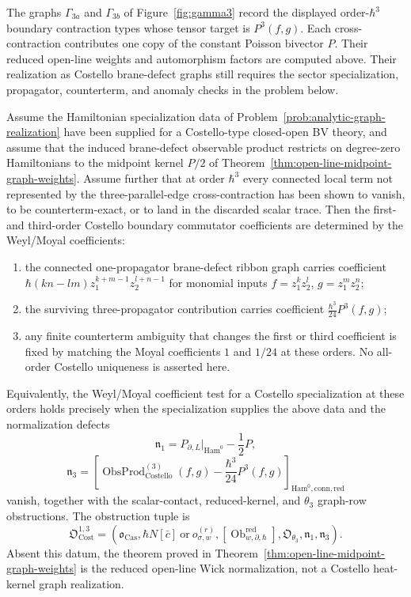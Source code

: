 \documentclass[11pt]{memoir}
\begin{document}
The graphs $\Gamma_{3a}$ and $\Gamma_{3b}$ of Figure~\ref{fig:gamma3} record the
displayed order-$\hbar^3$ boundary contraction types whose tensor target is
$P^3(f,g)$. Each cross-contraction contributes one copy of the constant Poisson
bivector $P$. Their reduced open-line weights and automorphism factors are
computed above. Their realization as Costello brane-defect graphs still
requires the sector specialization, propagator, counterterm, and anomaly
checks in the problem below.

\begin{thm}\label{thm:first-third-costello-normalizations}
  Assume the Hamiltonian specialization data of
  Problem~\ref{prob:analytic-graph-realization} have been supplied for a
  Costello-type closed-open BV theory, and assume that the induced
  brane-defect observable product restricts on degree-zero Hamiltonians to the
  midpoint kernel $P/2$ of
  Theorem~\ref{thm:open-line-midpoint-graph-weights}. Assume further that
  at order $\hbar^3$ every connected local term not represented by the
  three-parallel-edge cross-contraction has been shown to vanish, to be
  counterterm-exact, or to land in the discarded scalar trace. Then the first-
  and third-order Costello boundary commutator coefficients are determined by
  the Weyl/Moyal coefficients:
  \begin{enumerate}
    \item the connected one-propagator brane-defect ribbon graph carries
      coefficient $\hbar(kn-lm)z_1^{k+m-1}z_2^{l+n-1}$ for monomial inputs
      $f=z_1^kz_2^l$, $g=z_1^mz_2^n$;
    \item the surviving three-propagator contribution carries coefficient
      $\frac{\hbar^3}{24}P^3(f,g)$;
    \item any finite counterterm ambiguity that changes the first or third
      coefficient is fixed by matching the Moyal coefficients $1$ and
      $1/24$ at these orders. No all-order Costello uniqueness is asserted
      here.
  \end{enumerate}
  Equivalently, the Weyl/Moyal coefficient test for a Costello specialization
  at these orders holds precisely
  when the specialization supplies the above data and the normalization
  defects
  \[
    \mathfrak n_1
    =
    P_{\partial,L}|_{\mathrm{Ham}^0}-\frac12P,
  \]
  \[
    \mathfrak n_3
    =
    \left[
      \operatorname{ObsProd}^{(3)}_{\mathrm{Costello}}(f,g)
      -\frac{\hbar^3}{24}P^3(f,g)
    \right]_{\mathrm{Ham}^0,\mathrm{conn},\mathrm{red}}
  \]
  vanish, together with the scalar-contact, reduced-kernel, and
  \(\theta_3\) graph-row obstructions.  The obstruction tuple is
  \[
    \mathfrak O_{\mathrm{Cost}}^{1,3}
    =
    (\mathfrak o_{\mathrm{Cas}},
     \hbar N[\bar c]\ \text{or}\ o_{\sigma,w}^{(r)},
     [\operatorname{Ob}^{\mathrm{red}}_{w,\partial,\hbar}],
     \mathfrak O_{\theta_3},
     \mathfrak n_1,
     \mathfrak n_3).
  \]
  Absent this datum, the theorem proved in
  Theorem~\ref{thm:open-line-midpoint-graph-weights} is the reduced
  open-line Wick normalization, not a Costello heat-kernel graph
  realization.
\end{thm}
\end{document}
